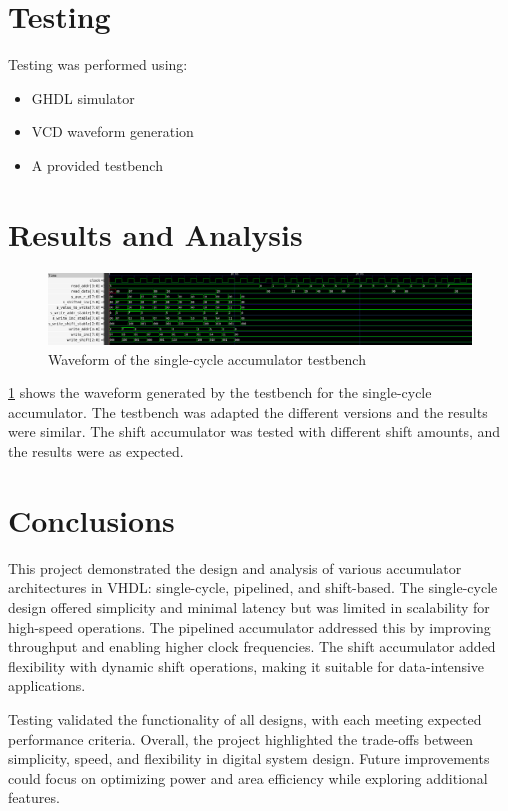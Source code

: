 \documentclass[a4paper,12pt]{article}
\begin{document}
\section{Testing}
Testing was performed using:
\begin{itemize}
    \item GHDL simulator
    \item VCD waveform generation
    \item A provided testbench  %
\end{itemize}

\section{Results and Analysis}
\begin{figure}[H]
    \centering
    \includegraphics[width=0.8\linewidth]{waveform.png}
    \caption{Waveform of the single-cycle accumulator testbench}
    \label{fig:waveform}
\end{figure}

\ref{fig:waveform} shows the waveform generated by the testbench for the single-cycle accumulator. The testbench was adapted the different versions and the results were similar. The shift accumulator was tested with different shift amounts, and the results were as expected.

\section{Conclusions}
This project demonstrated the design and analysis of various accumulator architectures in VHDL: single-cycle, pipelined, and shift-based. The single-cycle design offered simplicity and minimal latency but was limited in scalability for high-speed operations. The pipelined accumulator addressed this by improving throughput and enabling higher clock frequencies. The shift accumulator added flexibility with dynamic shift operations, making it suitable for data-intensive applications.

Testing validated the functionality of all designs, with each meeting expected performance criteria. Overall, the project highlighted the trade-offs between simplicity, speed, and flexibility in digital system design. Future improvements could focus on optimizing power and area efficiency while exploring additional features.
\end{document}
